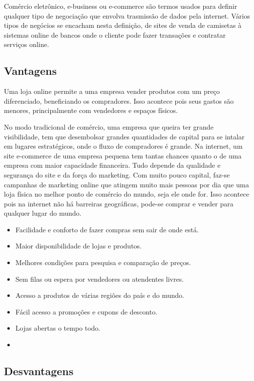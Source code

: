 Comércio eletrônico, e-business ou e-commerce são termos usados para definir qualquer tipo de negociação que envolva trasmissão de dados pela internet\cite{WhatIsEcommerce}. Vários tipos de negócios se encacham nesta definição, de sites de venda de camisetas à sistemas online de bancos onde o cliente pode fazer transações e contratar serviços online.

\subsection{Vantagens}

Uma loja online permite a uma empresa vender produtos com um preço diferenciado, beneficiando os compradores. Isso acontece pois seus gastos são menores, principalmente com vendedores e espaços físicos.

No modo tradicional de comércio, uma empresa que queira ter grande visibilidade, tem que desembolsar grandes quantidades de capital para se intalar em lugares estratégicos, onde o fluxo de compradores é grande. Na internet, um site e-commerce de uma empresa pequena tem tantas chances quanto o de uma empresa com maior capacidade financeira. Tudo depende da qualidade e segurança do site e da força do marketing. Com muito pouco capital, faz-se campanhas de marketing online que atingem muito mais pessoas por dia que uma loja física no melhor ponto de comércio do mundo, seja ele onde for. Isso acontece pois na internet não há barreiras geográficas, pode-se comprar e vender para qualquer lugar do mundo.

\begin{itemize}
  \item Facilidade e conforto de fazer compras sem sair de onde está.
  \item Maior disponibilidade de lojas e produtos.
  \item Melhores condições para pesquisa e comparação de preços.
  \item Sem filas ou espera por vendedores ou atendentes livres.
  \item Acesso a produtos de várias regiões do país e do mundo.
  \item Fácil acesso a promoções e cupons de desconto.
  \item Lojas abertas o tempo todo.
  \item 
\end{itemize}

\subsection{Desvantagens}

